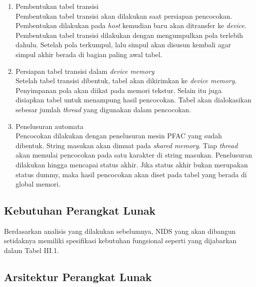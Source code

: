       \begin{enumerate}

      \item
      Pembentukan tabel transisi \\
      Pembentukan tabel transisi akan dilakukan saat persiapan pencocokan. Pembentukan dilakukan pada \emph{host} kemudian baru akan ditransfer ke \emph{device}. Pembentukan tabel transisi dilakukan dengan mengumpulkan pola terlebih dahulu. Setelah pola terkumpul, lalu simpul akan disusun kembali agar simpul akhir berada di bagian paling awal tabel. 

      \item
      Persiapan tabel transisi dalam \emph{device memory} \\
      Setelah tabel transisi dibentuk, tabel akan dikirimkan ke \emph{device memory}. Penyimpanan pola akan diikat pada memori tekstur. Selain itu juga disiapkan tabel untuk menampung hasil pencocokan. Tabel akan dialokasikan sebesar jumlah \emph{thread} yang digunakan dalam pencocokan.

      \item
      Penelusuran automata \\
      Pencocokan dilakukan dengan penelusuran mesin PFAC yang sudah dibentuk. String masukan akan dimuat pada \emph{shared memory}. Tiap \emph{thread} akan memulai pencocokan pada satu karakter di string masukan. Penelusuran dilakukan hingga mencapai status akhir. Jika status akhir bukan merupakan status dummy, maka hasil pencocokan akan diset pada tabel yang berada di global memori.

      \end{enumerate}

    \subsection{Kebutuhan Perangkat Lunak}

      Berdasarkan analisis yang dilakukan sebelumnya, NIDS yang akan dibangun setidaknya memiliki spesifikasi kebutuhan fungsional seperti yang dijabarkan dalam Tabel III.1.
      
      



    \subsection{Arsitektur Perangkat Lunak}

